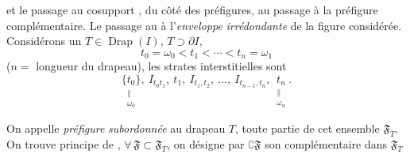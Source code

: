 \documentclass[11pt,a4paper]{article}
\begin{document}
et le passage au cosupport , du côté des préfigures, au passage à  la préfigure complémentaire. Le passage au   à l'\emph{enveloppe} \emph{irrédondante} de la figure considérée. Considérons un  $T \in \operatorname{Drap}(I)$, $T \supset \partial I$,
\[
  t_0 = \omega_0 < t_1 < \cdots < t_n = \omega_1
\]
($n = $ longueur du drapeau), les strates interstitielles sont
\[
  \underset{\substack{\| \\ \omega_0}}{\{t_0\}},\ I_{t_0 t_1},\ t_1,\ I_{t_1, t_2},\ \ldots,\ I_{t_{n-1}, t_n},\ \underset{\substack{\| \\ \omega_n}}{t_n} .
\]

On appelle \emph{préfigure} \emph{subordonnée} au drapeau $T$, toute partie  de cet ensemble $\mathfrak{F}_T$. On trouve   principe de   , $\forall\, \mathfrak{F} \subset \mathfrak{F}_T$, on désigne par $\complement\mathfrak{F}$ son complémentaire dans $\mathfrak{F}_T$
\end{document}

